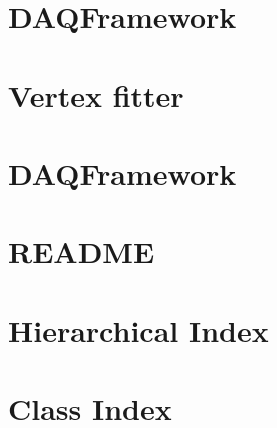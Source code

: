 \let\mypdfximage\pdfximage\def\pdfximage{\immediate\mypdfximage}\documentclass[twoside]{book}
\newcommand{\+}{\discretionary{\mbox{\scriptsize$\hookleftarrow$}}{}{}}
\begin{document}
\chapter{DAQFramework}
\label{md_UserTools_vectgen_README}

\chapter{Vertex fitter}
\label{md_UserTools_VertexFitter_README}

\chapter{DAQFramework}
\label{md_UserTools_WriteSkEvent_README}

\chapter{README}
\label{md_DataModel_README}

\chapter{Hierarchical Index}

\chapter{Class Index}

\end{document}
